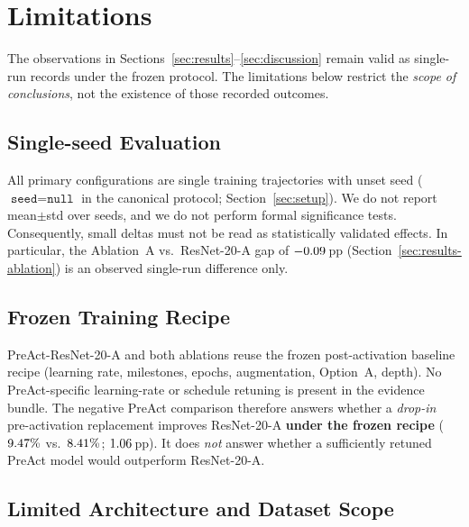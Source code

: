 \section{Limitations}
\label{sec:limitations}


The observations in Sections~\ref{sec:results}--\ref{sec:discussion} remain valid as
single-run records under the frozen protocol.
The limitations below restrict the \emph{scope of conclusions}, not the existence of those
recorded outcomes.

\subsection{Single-seed Evaluation}
\label{sec:lim-seed}

All primary configurations are single training trajectories with unset seed
($\texttt{seed}{=}\texttt{null}$ in the canonical protocol; Section~\ref{sec:setup}).
We do not report mean$\pm$std over seeds, and we do not perform formal significance tests.
Consequently, small deltas must not be read as statistically validated effects.
In particular, the Ablation~A vs.\ ResNet-20-A gap of $-0.09$\,pp
(Section~\ref{sec:results-ablation}) is an observed single-run difference only.

\subsection{Frozen Training Recipe}
\label{sec:lim-recipe}

PreAct-ResNet-20-A and both ablations reuse the frozen post-activation baseline recipe
(learning rate, milestones, epochs, augmentation, Option~A, depth).
No PreAct-specific learning-rate or schedule retuning is present in the evidence bundle.
The negative PreAct comparison therefore answers whether a \emph{drop-in} pre-activation
replacement improves ResNet-20-A \textbf{under the frozen recipe}
($9.47\%$ vs.\ $8.41\%$; $1.06$\,pp).
It does \emph{not} answer whether a sufficiently retuned PreAct model would outperform
ResNet-20-A.

\subsection{Limited Architecture and Dataset Scope}
\label{sec:lim-scope}

